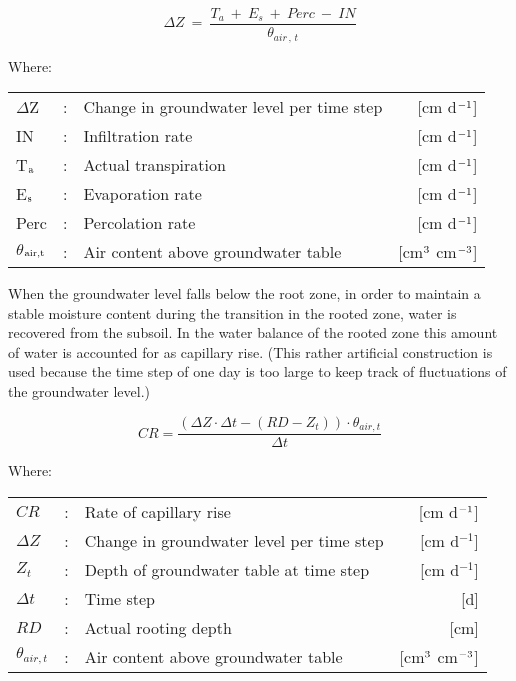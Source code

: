\begin{equation}
\Delta Z ~=~{\frac{T _{a} ~+~ E _{s} ~+~ Perc ~-~ IN }{\theta _{air\, ,\, t} }}
\end{equation}

Where:\\[5pt]
\begin{tabularx}{\textwidth}{llXr}
$\Delta$Z &:& Change in groundwater level per time step  & [cm d$^{{\rm -1}}$]\\
IN &:& Infiltration rate  & [cm d$^{{\rm -1}}$]\\
T$_{{\rm a}}$ &:& Actual transpiration  & [cm d$^{{\rm -1}}$]\\
E$_{{\rm s}}$ &:& Evaporation rate  & [cm d$^{{\rm -1}}$]\\
Perc &:& Percolation rate  & [cm d$^{{\rm -1}}$]\\
$\theta$$_{{\rm air,t}}$ &:& Air content above groundwater table  & [cm$^{{\rm 3}}$ cm$^{{\rm -3}}$]
\end{tabularx}

When the groundwater level falls below the root zone, in order to maintain a stable
moisture content during the transition in the rooted zone, water is recovered from the
subsoil. In the water balance of the rooted zone this amount of water is accounted for as
capillary rise. (This rather artificial construction is used because the time step of one day
is too large to keep track of fluctuations of the groundwater level.)

\begin{equation}
CR = {\frac{ (\Delta Z \cdot \Delta t - (RD - Z_{t})) \cdot \theta_{air, t} }{\Delta t}}
\end{equation}

Where:\\[5pt]
\begin{tabularx}{\textwidth}{llXr}
$CR$ &:& Rate of capillary rise  & [cm d$^{{\rm -1}}$]\\
$\Delta Z$ &:& Change in groundwater level per time step  & [cm d$^{-1}$]\\ 
$Z_{t}$ &:& Depth of groundwater table at time step  & [cm d$^{-1}$]\\
$\Delta t$ &:& Time step  & [d]\\
$RD$ &:& Actual rooting depth  & [cm]\\
$\theta_{air,t}$ &:& Air content above groundwater table  & [cm$^{{\rm 3}}$ cm$^{{\rm -3}}$]\\
\end{tabularx}


